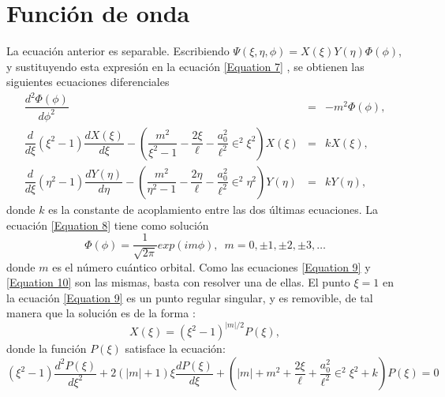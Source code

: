 \documentclass[12pt]{article}
\begin{document}
        \section{Función de onda}
        La ecuación anterior es separable. 
        Escribiendo $\Psi\left(\xi,\eta,\phi\right) = X\left(\xi\right)Y\left(\eta\right)\Phi\left(\phi\right)$, y 
        sustituyendo esta expresión en la ecuación 
        \eqref{Equation 7} , se obtienen las siguientes ecuaciones 
        diferenciales
        \begin{eqnarray}
            \dfrac{d^{2}\Phi (\phi)}{d\phi^{2}} &=& -m^{2}\Phi(\phi), \label{Equation 8} \\
            \dfrac{d}{d\xi}\left(\xi^{2}-1\right)\dfrac{dX(\xi)}{d\xi} - \left(\dfrac{m^{2}}{\xi^{2}-1}-\dfrac{2\xi}{\ell}-\dfrac{a_{0}^{2}}{\ell^{2}}\in^{2}\xi^{2}\right)X(\xi) &=& kX(\xi), \label{Equation 9} \\
            \dfrac{d}{d\xi}\left(\eta^{2}-1\right)\dfrac{dY(\eta)}{d\eta} - \left(\dfrac{m^{2}}{\eta^{2}-1}-\dfrac{2\eta}{\ell}-\dfrac{a_{0}^{2}}{\ell^{2}}\in^{2}\eta^{2}\right)Y(\eta) &=& kY(\eta), \label{Equation 10}
        \end{eqnarray}
        donde $k$ es la constante de acoplamiento 
        entre las dos últimas ecuaciones. La ecuación 
        \eqref{Equation 8} tiene como solución
        \begin{equation} \label{Equation 11}
            \Phi(\phi) = \dfrac{1}{\sqrt{2\pi}}exp(im\phi), \, \, \, m = 0, \pm 1, \pm 2, \pm 3, \dots 
        \end{equation}
        donde $m$ es el número cuántico orbital. 
        Como las ecuaciones \eqref{Equation 9} y \eqref{Equation 10} son las mismas, 
        basta con resolver una de ellas. El punto $\xi = 1$ 
        en la ecuación \eqref{Equation 9} es un punto regular singular, 
        y es removible, de tal manera que la solución 
        es de la forma \textcolor{blue}{\cite{Tijonov}}:
        \begin{equation}\label{Equation 12}
            X(\xi) = \left(\xi^{2}-1\right)^{|m|/2}P(\xi),
        \end{equation}
        donde la función $P(\xi)$ satisface la ecuación:
        \begin{equation}\label{Equation 13}
            \left(\xi^{2}-1\right)\dfrac{d^{2}P(\xi)}{d\xi^{2}} + 2\left(|m| + 1\right)\xi \dfrac{dP(\xi)}{d\xi} + \left(|m| + m^{2} + \dfrac{2\xi}{\ell} + \dfrac{a_{0}^{2}}{\ell^{2}}\in^{2}\xi^{2} + k\right)P(\xi) = 0
        \end{equation}
\end{document}

